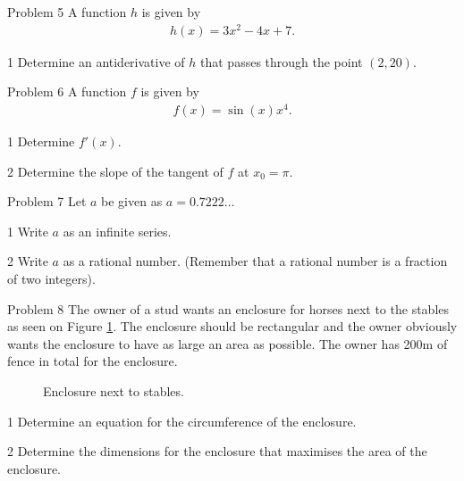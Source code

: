 \documentclass[12pt,x11names,a4paper]{article}
\begin{document}
%
%
%
%
%
\newpage
%
%
\begin{opgavetekst}{Problem 5}
	A function $h$ is given by
	\begin{align*}
		h(x) = 3x^2 - 4x + 7.
	\end{align*}
\end{opgavetekst}
\begin{delopgave}{1}
	Determine an antiderivative of $h$ that passes through the point $(2,20)$. 
\end{delopgave}
%
%
%
%
%
\begin{opgavetekst}{Problem 6}
	A function $f$ is given by
	\begin{align*}
		f(x) = \sin(x)x^4.
	\end{align*}
\end{opgavetekst}
\begin{delopgave}{1}
	Determine $f'(x)$. 
\end{delopgave}
\begin{delopgave}{2}
	Determine the slope of the tangent of $f$ at $x_0 = \pi$. 
\end{delopgave}
%
%
%
%
%
\begin{opgavetekst}{Problem 7}
	Let $a$ be given as $a = 0.7222\hdots$
\end{opgavetekst}
%
%
\begin{delopgave}{1}
	Write $a$ as an infinite series. 
\end{delopgave}
\begin{delopgave}{2}
	Write $a$ as a rational number. (Remember that a rational number is a fraction of two integers). 
\end{delopgave}
%
%
%
%
%
\begin{opgavetekst}{Problem 8}
	The owner of a stud wants an enclosure for horses next to the stables as seen on Figure \ref{fig:horse}.
	The enclosure should be rectangular and the owner obviously wants the enclosure to have as large an area as
	possible. The owner has 200m of fence in total for the enclosure.
	\begin{figure}[H]
		\centering
		\caption{Enclosure next to stables.}
		\label{fig:horse}
	\end{figure}
	\phantom{h}
\end{opgavetekst}
\begin{delopgave}{1}
	Determine an equation for the circumference of the enclosure.
\end{delopgave}
\begin{delopgave}{2}
	Determine the dimensions for the enclosure that maximises the area of the enclosure. 
\end{delopgave}
\end{document}
